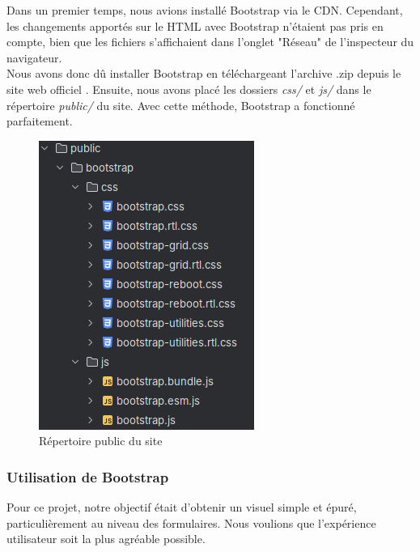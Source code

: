 \documentclass[12pt,a4paper]{article}
\begin{document}
	Dans un premier temps, nous avions installé Bootstrap via le CDN. Cependant, les changements apportés sur le HTML avec Bootstrap n'étaient pas pris en compte, bien que les fichiers s'affichaient dans l'onglet "Réseau" de l'inspecteur du navigateur. \\

	Nous avons donc dû installer Bootstrap en téléchargeant l'archive .zip depuis le site web officiel \cite{bootstrap}. Ensuite, nous avons placé les dossiers \textit{css/} et \textit{js/} dans le répertoire \textit{public/} du site. Avec cette méthode, Bootstrap a fonctionné parfaitement. \\

\begin{figure}[!h]
	\begin{center}
		\includegraphics[scale=1]{../images/bootstrap.png}
		\caption{Répertoire public du site}
	\end{center}
\end{figure}

\newpage
		\subsubsection{Utilisation de Bootstrap}

	Pour ce projet, notre objectif était d'obtenir un visuel simple et épuré, particulièrement au niveau des formulaires. Nous voulions que l'expérience utilisateur soit la plus agréable possible.
\end{document}
